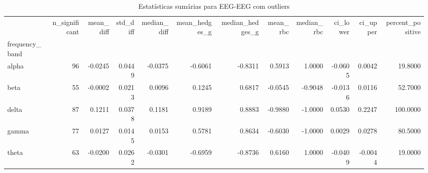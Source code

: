 \begin{table}[htbp]
\centering
\begin{tabular}{lrrrrrrrrrrr}
\toprule
 & n\_significant & mean\_diff & std\_diff & median\_diff & mean\_hedges\_g & median\_hedges\_g & mean\_rbc & median\_rbc & ci\_lower & ci\_upper & percent\_positive \\
frequency\_band &  &  &  &  &  &  &  &  &  &  &  \\
\midrule
alpha & 96 & -0.0245 & 0.0449 & -0.0375 & -0.6061 & -0.8311 & 0.5913 & 1.0000 & -0.0605 & 0.0042 & 19.8000 \\
beta & 55 & -0.0002 & 0.0213 & 0.0096 & 0.1245 & 0.6817 & -0.0545 & -0.9048 & -0.0136 & 0.0116 & 52.7000 \\
delta & 87 & 0.1211 & 0.0378 & 0.1181 & 0.9189 & 0.8883 & -0.9880 & -1.0000 & 0.0530 & 0.2247 & 100.0000 \\
gamma & 77 & 0.0127 & 0.0145 & 0.0153 & 0.5781 & 0.8634 & -0.6030 & -1.0000 & 0.0029 & 0.0278 & 80.5000 \\
theta & 63 & -0.0200 & 0.0262 & -0.0301 & -0.6959 & -0.8736 & 0.6160 & 1.0000 & -0.0409 & -0.0044 & 19.0000 \\
\bottomrule
\end{tabular}
\caption{Estatísticas sumárias para EEG-EEG com outliers}
\label{tab:summary\_eeg\_eeg\_with}
\end{table}
